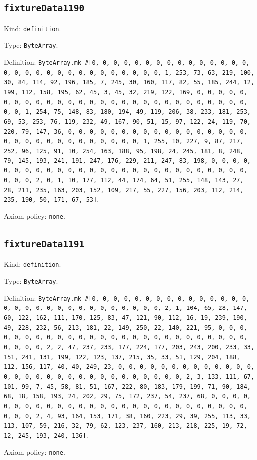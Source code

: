 \documentclass[11pt]{article}
\begin{document}
\subsection*{\texttt{fixtureData1190}}
\noindent Kind: \texttt{definition}.\par
\noindent Type: \texttt{ByteArray}.\par
\noindent Definition: \texttt{ByteArray.mk \#[0, 0, 0, 0, 0, 0, 0, 0, 0, 0, 0, 0, 0, 0, 0, 0, 0, 0, 0, 0, 0, 0, 0, 0, 0, 0, 0, 0, 0, 0, 1, 253, 73, 63, 219, 100, 30, 84, 114, 92, 196, 185, 7, 245, 30, 160, 117, 82, 55, 185, 244, 12, 199, 112, 158, 195, 62, 45, 3, 45, 32, 219, 122, 169, 0, 0, 0, 0, 0, 0, 0, 0, 0, 0, 0, 0, 0, 0, 0, 0, 0, 0, 0, 0, 0, 0, 0, 0, 0, 0, 0, 0, 0, 0, 1, 254, 75, 148, 83, 180, 194, 49, 119, 206, 38, 233, 181, 253, 69, 53, 253, 76, 119, 232, 49, 167, 90, 51, 15, 97, 122, 24, 119, 70, 220, 79, 147, 36, 0, 0, 0, 0, 0, 0, 0, 0, 0, 0, 0, 0, 0, 0, 0, 0, 0, 0, 0, 0, 0, 0, 0, 0, 0, 0, 0, 0, 0, 0, 1, 255, 10, 227, 9, 87, 217, 252, 96, 125, 91, 10, 254, 163, 188, 95, 198, 24, 245, 181, 8, 248, 79, 145, 193, 241, 191, 247, 176, 229, 211, 247, 83, 198, 0, 0, 0, 0, 0, 0, 0, 0, 0, 0, 0, 0, 0, 0, 0, 0, 0, 0, 0, 0, 0, 0, 0, 0, 0, 0, 0, 0, 0, 0, 2, 0, 1, 10, 177, 112, 44, 174, 64, 51, 255, 148, 143, 27, 28, 211, 235, 163, 203, 152, 109, 217, 55, 227, 156, 203, 112, 214, 235, 190, 50, 171, 67, 53]}.\par
\noindent Axiom policy: \texttt{none}.\par
\subsection*{\texttt{fixtureData1191}}
\noindent Kind: \texttt{definition}.\par
\noindent Type: \texttt{ByteArray}.\par
\noindent Definition: \texttt{ByteArray.mk \#[0, 0, 0, 0, 0, 0, 0, 0, 0, 0, 0, 0, 0, 0, 0, 0, 0, 0, 0, 0, 0, 0, 0, 0, 0, 0, 0, 0, 0, 0, 2, 1, 104, 65, 28, 147, 60, 122, 162, 111, 170, 125, 83, 47, 121, 90, 112, 16, 19, 239, 190, 49, 228, 232, 56, 213, 181, 22, 149, 250, 22, 140, 221, 95, 0, 0, 0, 0, 0, 0, 0, 0, 0, 0, 0, 0, 0, 0, 0, 0, 0, 0, 0, 0, 0, 0, 0, 0, 0, 0, 0, 0, 0, 0, 2, 2, 47, 237, 233, 177, 224, 177, 203, 243, 200, 233, 33, 151, 241, 131, 199, 122, 123, 137, 215, 35, 33, 51, 129, 204, 188, 112, 156, 117, 40, 40, 249, 23, 0, 0, 0, 0, 0, 0, 0, 0, 0, 0, 0, 0, 0, 0, 0, 0, 0, 0, 0, 0, 0, 0, 0, 0, 0, 0, 0, 0, 0, 0, 2, 3, 133, 111, 67, 101, 99, 7, 45, 58, 81, 51, 167, 222, 80, 183, 179, 199, 71, 90, 184, 68, 18, 158, 193, 24, 202, 29, 75, 172, 237, 54, 237, 68, 0, 0, 0, 0, 0, 0, 0, 0, 0, 0, 0, 0, 0, 0, 0, 0, 0, 0, 0, 0, 0, 0, 0, 0, 0, 0, 0, 0, 0, 0, 2, 4, 93, 164, 153, 171, 38, 160, 223, 29, 39, 255, 113, 33, 113, 107, 59, 216, 32, 79, 62, 123, 237, 160, 213, 218, 225, 19, 72, 12, 245, 193, 240, 136]}.\par
\noindent Axiom policy: \texttt{none}.\par
\end{document}
